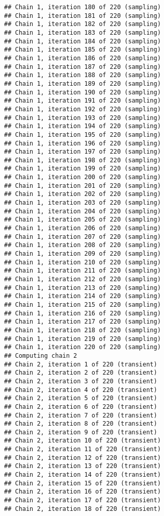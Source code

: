 \documentclass[]{book}
\begin{document}
\begin{verbatim}
## Chain 1, iteration 180 of 220 (sampling)
## Chain 1, iteration 181 of 220 (sampling)
## Chain 1, iteration 182 of 220 (sampling)
## Chain 1, iteration 183 of 220 (sampling)
## Chain 1, iteration 184 of 220 (sampling)
## Chain 1, iteration 185 of 220 (sampling)
## Chain 1, iteration 186 of 220 (sampling)
## Chain 1, iteration 187 of 220 (sampling)
## Chain 1, iteration 188 of 220 (sampling)
## Chain 1, iteration 189 of 220 (sampling)
## Chain 1, iteration 190 of 220 (sampling)
## Chain 1, iteration 191 of 220 (sampling)
## Chain 1, iteration 192 of 220 (sampling)
## Chain 1, iteration 193 of 220 (sampling)
## Chain 1, iteration 194 of 220 (sampling)
## Chain 1, iteration 195 of 220 (sampling)
## Chain 1, iteration 196 of 220 (sampling)
## Chain 1, iteration 197 of 220 (sampling)
## Chain 1, iteration 198 of 220 (sampling)
## Chain 1, iteration 199 of 220 (sampling)
## Chain 1, iteration 200 of 220 (sampling)
## Chain 1, iteration 201 of 220 (sampling)
## Chain 1, iteration 202 of 220 (sampling)
## Chain 1, iteration 203 of 220 (sampling)
## Chain 1, iteration 204 of 220 (sampling)
## Chain 1, iteration 205 of 220 (sampling)
## Chain 1, iteration 206 of 220 (sampling)
## Chain 1, iteration 207 of 220 (sampling)
## Chain 1, iteration 208 of 220 (sampling)
## Chain 1, iteration 209 of 220 (sampling)
## Chain 1, iteration 210 of 220 (sampling)
## Chain 1, iteration 211 of 220 (sampling)
## Chain 1, iteration 212 of 220 (sampling)
## Chain 1, iteration 213 of 220 (sampling)
## Chain 1, iteration 214 of 220 (sampling)
## Chain 1, iteration 215 of 220 (sampling)
## Chain 1, iteration 216 of 220 (sampling)
## Chain 1, iteration 217 of 220 (sampling)
## Chain 1, iteration 218 of 220 (sampling)
## Chain 1, iteration 219 of 220 (sampling)
## Chain 1, iteration 220 of 220 (sampling)
## Computing chain 2
## Chain 2, iteration 1 of 220 (transient)
## Chain 2, iteration 2 of 220 (transient)
## Chain 2, iteration 3 of 220 (transient)
## Chain 2, iteration 4 of 220 (transient)
## Chain 2, iteration 5 of 220 (transient)
## Chain 2, iteration 6 of 220 (transient)
## Chain 2, iteration 7 of 220 (transient)
## Chain 2, iteration 8 of 220 (transient)
## Chain 2, iteration 9 of 220 (transient)
## Chain 2, iteration 10 of 220 (transient)
## Chain 2, iteration 11 of 220 (transient)
## Chain 2, iteration 12 of 220 (transient)
## Chain 2, iteration 13 of 220 (transient)
## Chain 2, iteration 14 of 220 (transient)
## Chain 2, iteration 15 of 220 (transient)
## Chain 2, iteration 16 of 220 (transient)
## Chain 2, iteration 17 of 220 (transient)
## Chain 2, iteration 18 of 220 (transient)

\end{verbatim}
\end{document}
